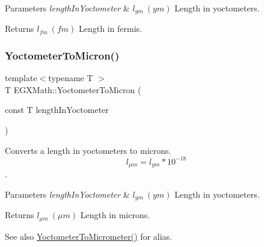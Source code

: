 \begin{DoxyParams}{Parameters}
{\em length\+In\+Yoctometer} & $ l_{ym}\ (ym)$ Length in yoctometers. \\
\hline
\end{DoxyParams}
\begin{DoxyReturn}{Returns}
$ l_{fm}\ (fm)$ Length in fermis. 
\end{DoxyReturn}
\mbox{\label{group___e_g_x_math-_conversions-_length_conversions-_s_i-_yoctometer-_non-_s_i_ga4863fe4d5268ab023ec32d0281171b55}} 
\subsubsection{\texorpdfstring{Yoctometer\+To\+Micron()}{YoctometerToMicron()}}
{\footnotesize\ttfamily template$<$typename T $>$ \\
T E\+G\+X\+Math\+::\+Yoctometer\+To\+Micron (\begin{DoxyParamCaption}\item[{const T}]{length\+In\+Yoctometer }\end{DoxyParamCaption})}



Converts a length in yoctometers to microns. \[ l_{\mu m}=l_{ym} * 10^{-18} \]. 


\begin{DoxyParams}{Parameters}
{\em length\+In\+Yoctometer} & $ l_{ym}\ (ym)$ Length in yoctometers. \\
\hline
\end{DoxyParams}
\begin{DoxyReturn}{Returns}
$ l_{\mu m}\ (\mu m)$ Length in microns. 
\end{DoxyReturn}
\begin{DoxySeeAlso}{See also}
\mbox{\hyperlink{group___e_g_x_math-_conversions-_length_conversions-_s_i-_yoctometer-_s_i_ga910145f68803fbaa87afd1d30d48c96e}{Yoctometer\+To\+Micrometer()}} for alias. 
\end{DoxySeeAlso}
\mbox{\label{group___e_g_x_math-_conversions-_length_conversions-_s_i-_yoctometer-_non-_s_i_ga6a6a1fb3ecc97e377fc728c03327048e}} 
